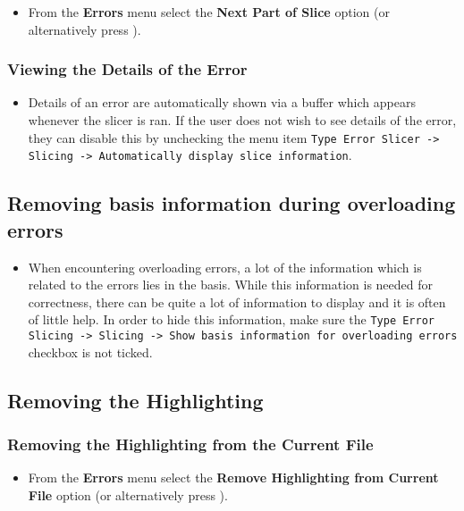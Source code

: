 \documentclass{article}
\begin{document}
\begin{itemize}
\item From the \textbf{Errors} menu select the \textbf{Next Part of
  Slice} option (or alternatively press ).
\end{itemize}

\subsubsection{Viewing the Details of the Error}

\begin{itemize}
\item Details of an error are automatically shown via a buffer which
  appears whenever the slicer is ran. If the user does not wish to see
  details of the error, they can disable this by unchecking the menu
  item \texttt{Type Error Slicer -> Slicing -> Automatically display
    slice information}.
\end{itemize}

\subsection{Removing basis information during overloading errors}
\begin{itemize}
\item When encountering overloading errors, a lot of the information
  which is related to the errors lies in the basis. While this
  information is needed for correctness, there can be quite a lot of
  information to display and it is often of little help. In order to
  hide this information, make sure the \texttt{Type Error Slicing ->
    Slicing -> Show basis information for overloading errors} checkbox
  is not ticked.
\end{itemize}


\subsection{Removing the Highlighting}

\subsubsection{Removing the Highlighting from the Current File}

\begin{itemize}
\item From the \textbf{Errors} menu select the \textbf{Remove
  Highlighting from Current File} option (or alternatively press
  ).
\end{itemize}
\end{document}
